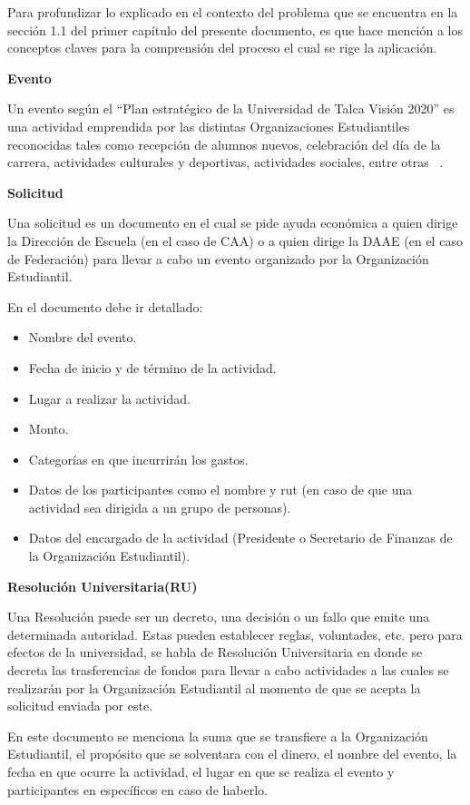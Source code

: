 Para profundizar lo explicado en el contexto del problema que se encuentra en la sección 1.1 del primer capítulo del presente documento, es que hace mención a los conceptos claves para la comprensión del proceso el cual se rige la aplicación.

\textbf{Evento}

  Un evento según el ``Plan estratégico de la Universidad de Talca Visión 2020'' es una actividad emprendida por las distintas Organizaciones Estudiantiles reconocidas tales como recepción de alumnos nuevos, celebración del día de la carrera, actividades culturales y deportivas, actividades sociales, entre otras ~\cite{5}. 

\textbf{Solicitud}

  Una solicitud es un documento en el cual se pide ayuda económica a quien dirige la Dirección de Escuela (en el caso de CAA) o a quien dirige la DAAE (en el caso de Federación) para llevar a cabo un evento organizado por la Organización Estudiantil. 

  En el documento debe ir detallado:
  \begin{itemize}
      \item Nombre del evento.
      \item Fecha de inicio y de término de la actividad.
      \item Lugar a realizar la actividad. 
      \item Monto. 
      \item Categorías en que incurrirán los gastos.
      \item Datos de los participantes como el nombre y rut (en caso de que una actividad sea dirigida a un grupo de personas). 
      \item Datos del encargado de la actividad (Presidente o Secretario de Finanzas de la Organización Estudiantil).
  \end{itemize}

\textbf{Resolución Universitaria(RU)}

  Una Resolución puede ser un decreto, una decisión o un fallo que emite una determinada autoridad. Estas pueden establecer reglas, voluntades, etc. pero para efectos de la universidad, se habla de Resolución Universitaria en donde se decreta las trasferencias de fondos para llevar a cabo actividades a las cuales se realizarán por la Organización Estudiantil al momento de que se acepta la solicitud enviada por este.

  En este documento se menciona la suma que se transfiere a la Organización Estudiantil, el propósito que se solventara con el dinero, el nombre del evento, la fecha en que ocurre la actividad, el lugar en que se realiza el evento y participantes en específicos en caso de haberlo.

